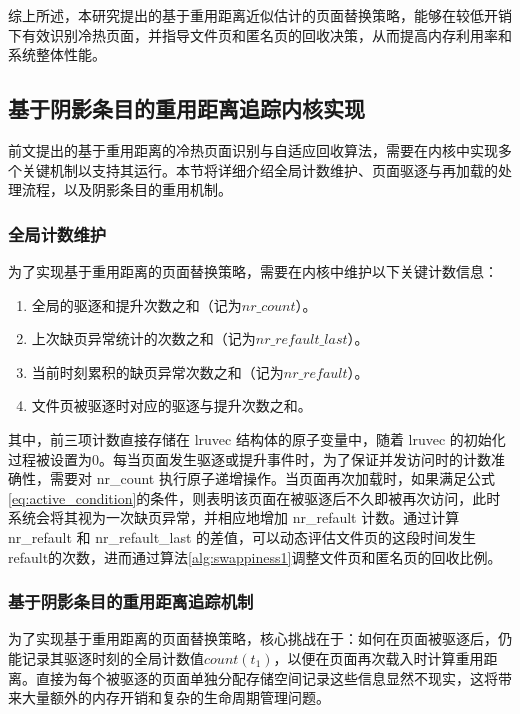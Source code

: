 综上所述，本研究提出的基于重用距离近似估计的页面替换策略，能够在较低开销下有效识别冷热页面，并指导文件页和匿名页的回收决策，从而提高内存利用率和系统整体性能。

\subsection{基于阴影条目的重用距离追踪内核实现}
\label{sec:shadow_entry_impl}

前文提出的基于重用距离的冷热页面识别与自适应回收算法，需要在内核中实现多个关键机制以支持其运行。本节将详细介绍全局计数维护、页面驱逐与再加载的处理流程，以及阴影条目的重用机制。

\subsubsection{全局计数维护}

为了实现基于重用距离的页面替换策略，需要在内核中维护以下关键计数信息：

\begin{enumerate}
  \item 全局的驱逐和提升次数之和（记为\(nr\_count\)）。
  \item 上次缺页异常统计的次数之和（记为\(nr\_refault\_last\)）。
  \item 当前时刻累积的缺页异常次数之和（记为\(nr\_refault\)）。
  \item 文件页被驱逐时对应的驱逐与提升次数之和。
\end{enumerate}

其中，前三项计数直接存储在 lruvec 结构体的原子变量中，随着 lruvec 的初始化过程被设置为0。每当页面发生驱逐或提升事件时，为了保证并发访问时的计数准确性，需要对 nr\_count 执行原子递增操作。当页面再次加载时，如果满足公式\ref{eq:active_condition}的条件，则表明该页面在被驱逐后不久即被再次访问，此时系统会将其视为一次缺页异常，并相应地增加 nr\_refault 计数。通过计算 nr\_refault 和 nr\_refault\_last 的差值，可以动态评估文件页的这段时间发生refault的次数，进而通过算法\ref{alg:swappiness1}调整文件页和匿名页的回收比例。

\subsubsection{基于阴影条目的重用距离追踪机制}
\label{sec:shadow_entry}
为了实现基于重用距离的页面替换策略，核心挑战在于：如何在页面被驱逐后，仍能记录其驱逐时刻的全局计数值\(count(t_1)\)，以便在页面再次载入时计算重用距离。直接为每个被驱逐的页面单独分配存储空间记录这些信息显然不现实，这将带来大量额外的内存开销和复杂的生命周期管理问题。

